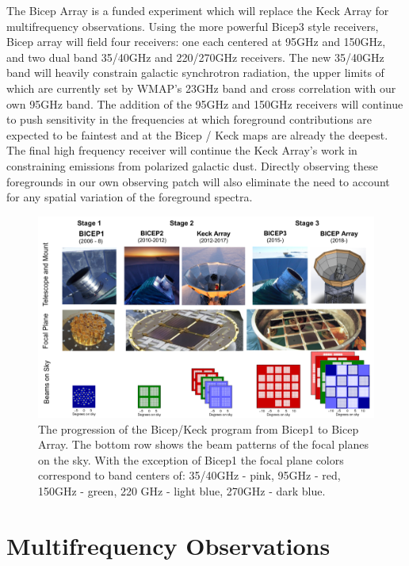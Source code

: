 \documentclass[12pt]{article}
\begin{document}
The Bicep Array is a funded experiment which will replace the Keck Array for
multifrequency observations. Using the more powerful Bicep3 style receivers,
Bicep array will field four receivers: one each centered at 95GHz and 150GHz,
and two dual band 35/40GHz and 220/270GHz receivers. The new 35/40GHz band will
heavily constrain galactic synchrotron radiation, the upper limits of
which are currently set by WMAP's 23GHz band and cross correlation with our
own 95GHz band. The addition of the 95GHz and 150GHz receivers will continue
to push sensitivity in the frequencies at which foreground contributions are
expected to be faintest and at the Bicep / Keck maps are already the deepest.
The final high frequency receiver will continue the Keck Array's work in
constraining emissions from polarized galactic dust. Directly observing
these foregrounds in our own observing patch will also eliminate the  need to
account for any spatial variation of the foreground spectra.



\begin{figure}
	\center
	\includegraphics[width=.8\textwidth]{BK_progression.png}
	\caption{The progression of the Bicep/Keck program from Bicep1 to Bicep
	Array. The bottom row shows the beam patterns of the focal planes on the
	sky. With the exception of Bicep1 the focal plane colors correspond to
	band centers of: 35/40GHz - pink, 95GHz - red, 150GHz - green, 220 GHz -
	light blue, 270GHz - dark blue.}
	\label{fig:BK_progression}
\end{figure}




\section{Multifrequency Observations}
\end{document}

